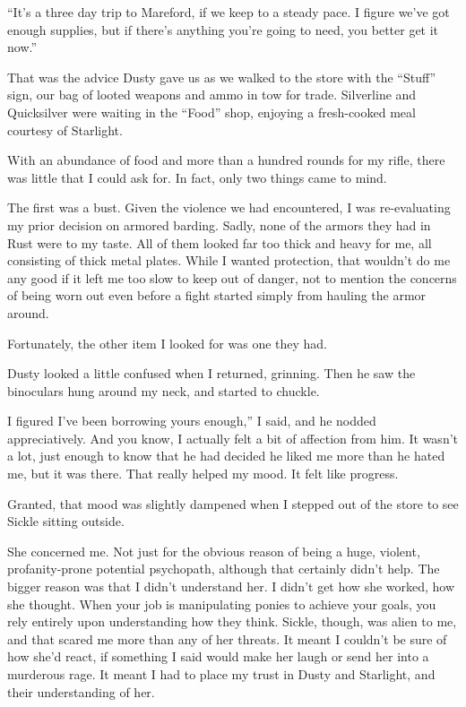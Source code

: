 “It’s a three day trip to Mareford, if we keep to a steady pace. I figure we’ve got enough supplies, but if there’s anything you’re going to need, you better get it now.”

That was the advice Dusty gave us as we walked to the store with the “Stuff” sign, our bag of looted weapons and ammo in tow for trade. Silverline and Quicksilver were waiting in the “Food” shop, enjoying a fresh-cooked meal courtesy of Starlight.

With an abundance of food and more than a hundred rounds for my rifle, there was little that I could ask for. In fact, only two things came to mind.

The first was a bust. Given the violence we had encountered, I was re-evaluating my prior decision on armored barding. Sadly, none of the armors they had in Rust were to my taste. All of them looked far too thick and heavy for me, all consisting of thick metal plates. While I wanted protection, that wouldn’t do me any good if it left me too slow to keep out of danger, not to mention the concerns of being worn out even before a fight started simply from hauling the armor around.

Fortunately, the other item I looked for was one they had.

Dusty looked a little confused when I returned, grinning. Then he saw the binoculars hung around my neck, and started to chuckle.

\leavevmode{}I figured I’ve been borrowing yours enough,” I said, and he nodded appreciatively. And you know, I actually felt a bit of affection from him. It wasn’t a lot, just enough to know that he had decided he liked me more than he hated me, but it was there. That really helped my mood. It felt like progress.

Granted, that mood was slightly dampened when I stepped out of the store to see Sickle sitting outside.

She concerned me. Not just for the obvious reason of being a huge, violent, profanity-prone potential psychopath, although that certainly didn’t help. The bigger reason was that I didn’t understand her. I didn’t get how she worked, how she thought. When your job is manipulating ponies to achieve your goals, you rely entirely upon understanding how they think. Sickle, though, was alien to me, and that scared me more than any of her threats. It meant I couldn’t be sure of how she’d react, if something I said would make her laugh or send her into a murderous rage. It meant I had to place my trust in Dusty and Starlight, and their understanding of her.

